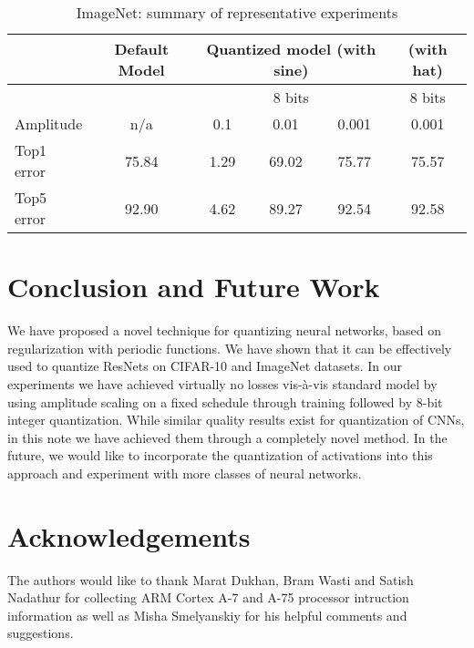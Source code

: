\documentclass{article}
\newcommand{\squeeze}{\vspace{-2.5mm}}
\begin{document}
\begin{table}[h]
\centering
\begin{tabular}{l|c|c|c|c|c|}
          & Default Model & \multicolumn{3}{c|}{Quantized model (with sine)} & (with hat) \\
\hline             
                &         & \multicolumn{3}{c|}{8 bits} & 8 bits \\
\hline
Amplitude       &  n/a    & 0.1   & 0.01  & 0.001   & 0.001 \\
\hline
Top1 error      & 75.84   & 1.29 & 69.02 & 75.77   & 75.57  \\
Top5 error      & 92.90   & 4.62 & 89.27 & 92.54   & 92.58  \\
\end{tabular}
\caption{ImageNet: summary of representative experiments}
\label{tab:imagenet_summary}
\squeeze
\end{table}


\section{Conclusion and Future Work}

We have proposed a novel technique for quantizing neural networks, based on regularization with periodic functions. We have shown that it can be effectively used to quantize ResNets on CIFAR-10 and ImageNet datasets. In our experiments we have achieved virtually no losses vis-à-vis standard model by using amplitude scaling on a fixed schedule through training followed by 8-bit integer quantization. While similar quality results exist for quantization of CNNs, in this note we have achieved them through a completely novel method. In the future, we would like to incorporate the quantization of activations into this approach and experiment with more classes of neural networks.  


\section*{Acknowledgements}

The authors would like to thank Marat Dukhan, Bram Wasti and Satish Nadathur for collecting ARM Cortex A-7 and A-75 processor intruction information as well as Misha Smelyanskiy for his helpful comments and suggestions.





\clearpage
\newpage
\end{document}
